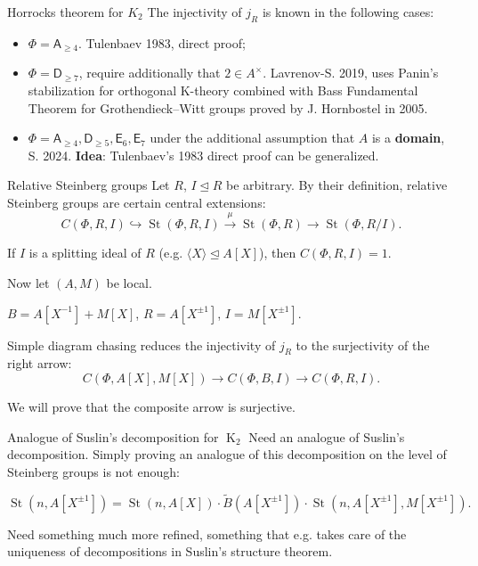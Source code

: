 \documentclass[handout]{beamer} %
\DeclareMathOperator{\K}{K}
\DeclareMathOperator{\St}{St}
\theoremstyle{definition}
\begin{document}
\begin{frame}{Horrocks theorem for $K_2$}
The injectivity of $j_R$ is known in the following cases:
 \begin{itemize}
  \item $\Phi=\mathsf{A}_{\geq 4}$. Tulenbaev 1983, direct proof;
  \pause
  \item $\Phi=\mathsf{D}_{\geq 7}$, require additionally that $2 \in A^\times$. Lavrenov-S. 2019, uses Panin's stabilization for orthogonal K-theory combined with Bass Fundamental Theorem for Grothendieck--Witt groups proved by J. Hornbostel in 2005.
  \pause
  \item $\Phi = \mathsf{A}_{\geq 4}, \mathsf{D}_{\geq 5}, \mathsf{E}_6, \mathsf{E}_7$ under the additional assumption that $A$ is a \textbf{domain}, S. 2024. \textbf{Idea}: Tulenbaev's 1983 direct proof can be generalized.
 \end{itemize}
\end{frame}

\begin{frame}{Relative Steinberg groups}
 Let $R$, $I \trianglelefteq R$ be arbitrary. By their definition, relative Steinberg groups are certain central extensions:
 \[ C(\Phi, R, I) \hookrightarrow \St(\Phi, R, I) \xrightarrow{\mu} \St(\Phi, R) \rightarrow \St(\Phi, R/I). \]
\pause

 If $I$ is a splitting ideal of $R$ (e.g. $\langle X \rangle \trianglelefteq A[X]$), then $C(\Phi, R, I) = 1$.
\pause

 Now let $(A, M)$ be local.
\pause

 $B = A[X^{-1}] + M[X]$, $R = A[X^{\pm 1}]$, $I = M[X^{\pm 1}]$.
\pause

 Simple diagram chasing reduces the injectivity of $j_R$ to the surjectivity of the right arrow:
 \[C(\Phi, A[X], M[X]) \longrightarrow C(\Phi, B, I) \longrightarrow C(\Phi, R, I).\]
\pause

 We will prove that the composite arrow is surjective.
\end{frame}

\begin{frame}{Analogue of Suslin's decomposition for $\K_2$}
  Need an analogue of Suslin's decomposition. Simply proving an analogue of this decomposition on the level of Steinberg groups is not enough:
\pause

  \[ \St(n, A[X^{\pm 1}]) = \St(n, A[X]) \cdot \widetilde{B}(A[X^{\pm 1}]) \cdot \St(n, A[X^{\pm 1}], M[X^{\pm 1}]). \]
\pause

  Need something much more refined, something that e.g. takes care of the uniqueness of decompositions in Suslin's structure theorem.
\end{frame}
\end{document}
